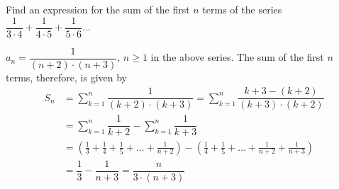 
%
%
%
%
% 
% 

\question[3] Find an expression for the sum of the first $n$ terms of the series 
$\dfrac{1}{3\cdot 4} + \dfrac{1}{4\cdot 5} + \dfrac{1}{5\cdot 6}\ldots$


\ifprintanswers
\fi 

\begin{solution}[\halfpage]
	 $a_n = \dfrac{1}{(n+2)\cdot(n+3)},\, n \geq 1$ in the above series. The sum of the 
	 first $n$ terms, therefore, is given by 
	 \begin{align}
	 	S_n &= \sum_{k=1}^{n}\dfrac{1}{(k+2)\cdot(k+3)} = \sum_{k=1}^{n}\dfrac{k+3 - (k+2)}{(k+3)\cdot(k+2)} \\
	 	&= \sum_{k=1}^{n}\dfrac{1}{k+2} - \sum_{k=1}^{n}\dfrac{1}{k+3} \\
	 	&= \left( \frac{1}{3} + \frac{1}{4} + \frac{1}{5} + \ldots + \frac{1}{n+2}\right) - 
	 	\left( \frac{1}{4} + \frac{1}{5} + \ldots + \frac{1}{n+2} + \frac{1}{n+3}\right) \\
	 	&= \dfrac{1}{3} - \dfrac{1}{n+3} = \dfrac{n}{3\cdot(n+3)}
	 \end{align}
\end{solution}
